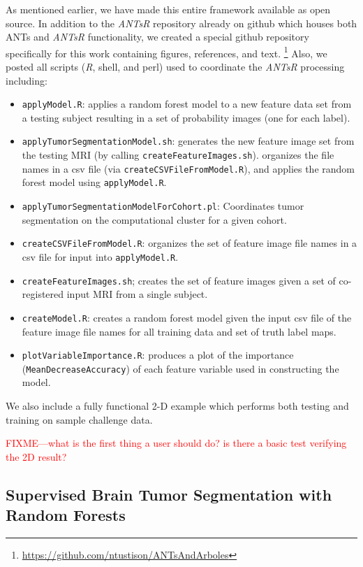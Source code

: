 \documentclass[final,5p,times,twocolumn]{elsarticle}
\begin{document}
As mentioned earlier, we have made this entire framework
available as open source.  In addition to the \textit{ANTsR} repository
already on github which houses both ANTs and \textit{ANTsR} functionality, 
we created a special github repository specifically for this work
containing figures, references, and text.%
\footnote{
\href{https://github.com/ntustison/ANTsAndArboles}{https://github.com/ntustison/ANTsAndArboles}
}
Also, we posted all
scripts (\textit{R}, shell, and perl) used to coordinate the \textit{ANTsR} processing 
including:
\begin{itemize}
  \item {\tt applyModel.R}:  applies a random forest model to a new 
  feature data set from a testing subject resulting in a set of probability
  images (one for each label).
  \item {\tt applyTumorSegmentationModel.sh}:  generates the new feature image set 
  from the testing MRI (by calling {\tt createFeatureImages.sh}).
  organizes the file names in a csv file (via {\tt createCSVFileFromModel.R}),
  and applies the random forest model using {\tt applyModel.R}. 
  \item {\tt applyTumorSegmentationModelForCohort.pl}:  Coordinates tumor 
  segmentation on the computational cluster for a given cohort.
  \item {\tt createCSVFileFromModel.R}:  organizes the set of feature image
  file names in a csv file for input into {\tt applyModel.R}.
  \item {\tt createFeatureImages.sh};  creates the set of feature images given
  a set of co-registered input MRI from a single subject. 
  \item {\tt createModel.R}:  creates a random forest model given the input csv 
  file of the feature image file names for all training data and set of truth
  label maps.
  \item {\tt plotVariableImportance.R}:  produces a plot of the importance 
  ({\tt MeanDecreaseAccuracy}) of each feature variable used 
  in constructing the model.
\end{itemize}
We also include a fully functional 2-D example which performs
both testing and training on sample challenge data.  

\textcolor{red}{FIXME---what is the first thing a user should do?  is
  there a basic test verifying the 2D result?}

\subsection{Supervised Brain Tumor Segmentation with Random Forests}
\end{document}
